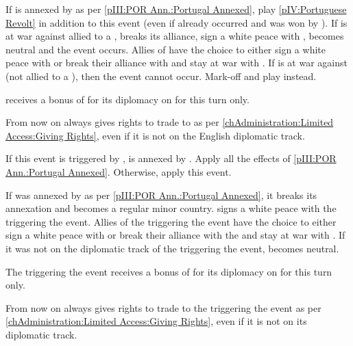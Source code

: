 
\condition{}
\aparag If \paysportugal is annexed by \HIS as per \ref{pIII:POR Ann.:Portugal
  Annexed}, play \ref{pIV:Portuguese Revolt} in addition to this event (even
if  already occurred and was won by \HIS).
\aparag If \ENG is at war against \paysportugal allied to a \MAJ, \paysportugal
breaks its alliance, sign a white peace with \ENG, becomes neutral and the
event occurs.
\bparag Allies of \ENG have the choice to either sign a white peace with
\paysportugal or break their alliance with \ENG and stay at war with
\paysportugal.
\bparag If \ENG is at war against \paysportugal (not allied to a \MAJ), then
the event cannot occur. Mark-off and play \RD instead.

\phdipl
\aparag \ENG receives a bonus of  for its diplomacy on \paysportugal
for this turn only.

\effetlong
\aparag From now on \paysportugal always gives rights to trade to \ENG as per
\ref{chAdministration:Limited Access:Giving Rights}, even if it is not on the
English diplomatic track.



\condition{}
\aparag If this event is triggered by \HIS, \paysportugal is annexed by
\HIS. Apply all the effects of \ref{pIII:POR Ann.:Portugal Annexed}.
\bparag Otherwise, apply this event.

\phevnt
\aparag If \paysportugal was annexed by \HIS as per \ref{pIII:POR
  Ann.:Portugal Annexed}, it breaks its annexation and becomes a regular minor
country.
\aparag \paysportugal signs a white peace with the \MAJ triggering the event.
\bparag Allies of the \MAJ triggering the event have the choice to either sign
a white peace with \paysportugal or break their alliance with the \MAJ and
stay at war with \paysportugal.
\aparag If it was not on the diplomatic track of the \MAJ triggering the
event, \paysportugal becomes neutral.

\phdipl
\aparag The \MAJ triggering the event receives a bonus of  for its
diplomacy on \paysportugal for this turn only.

\effetlong
\aparag From now on \paysportugal always gives rights to trade to the \MAJ
triggering the event as per \ref{chAdministration:Limited Access:Giving
  Rights}, even if it is not on its diplomatic track.



